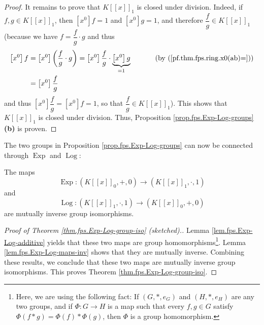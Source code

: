 \begin{proof}
It remains to prove that $K\left[  \left[  x\right]  \right]  _{1}$ is closed
under division. Indeed, if $f,g\in K\left[  \left[  x\right]  \right]  _{1}$,
then $\left[  x^{0}\right]  f=1$ and $\left[  x^{0}\right]  g=1$, and
therefore $\dfrac{f}{g}\in K\left[  \left[  x\right]  \right]  _{1}$ (because
we have $f=\dfrac{f}{g}\cdot g$ and thus
\begin{align*}
\left[  x^{0}\right]  f  &  =\left[  x^{0}\right]  \left(  \dfrac{f}{g}\cdot
g\right)  =\left[  x^{0}\right]  \dfrac{f}{g}\cdot\underbrace{\left[
x^{0}\right]  g}_{=1}\ \ \ \ \ \ \ \ \ \ \left(  \text{by
(\ref{pf.thm.fps.ring.x0(ab)=})}\right) \\
&  =\left[  x^{0}\right]  \dfrac{f}{g}%
\end{align*}
and thus $\left[  x^{0}\right]  \dfrac{f}{g}=\left[  x^{0}\right]  f=1$, so
that $\dfrac{f}{g}\in K\left[  \left[  x\right]  \right]  _{1}$). This shows
that $K\left[  \left[  x\right]  \right]  _{1}$ is closed under division.
Thus, Proposition \ref{prop.fps.Exp-Log-groups} \textbf{(b)} is proven.
\end{proof}

The two groups in Proposition \ref{prop.fps.Exp-Log-groups} can now be
connected through $\operatorname*{Exp}$ and $\operatorname*{Log}$:

\begin{theorem}
\label{thm.fps.Exp-Log-group-iso}The maps
\[
\operatorname*{Exp}:\left(  K\left[  \left[  x\right]  \right]  _{0}%
,+,0\right)  \rightarrow\left(  K\left[  \left[  x\right]  \right]  _{1}%
,\cdot,1\right)
\]
and%
\[
\operatorname*{Log}:\left(  K\left[  \left[  x\right]  \right]  _{1}%
,\cdot,1\right)  \rightarrow\left(  K\left[  \left[  x\right]  \right]
_{0},+,0\right)
\]
are mutually inverse group isomorphisms.
\end{theorem}

\begin{proof}
[Proof of Theorem \ref{thm.fps.Exp-Log-group-iso} (sketched).]Lemma
\ref{lem.fps.Exp-Log-additive} yields that these two maps are group
homomorphisms\footnote{Here, we are using the following fact: If $\left(
G,\ast,e_{G}\right)  $ and $\left(  H,\ast,e_{H}\right)  $ are any two groups,
and if $\Phi:G\rightarrow H$ is a map such that every $f,g\in G$ satisfy
$\Phi\left(  f\ast g\right)  =\Phi\left(  f\right)  \ast\Phi\left(  g\right)
$, then $\Phi$ is a group homomorphism.}. Lemma \ref{lem.fps.Exp-Log-maps-inv}
shows that they are mutually inverse. Combining these results, we conclude
that these two maps are mutually inverse group isomorphisms. This proves
Theorem \ref{thm.fps.Exp-Log-group-iso}.
\end{proof}

